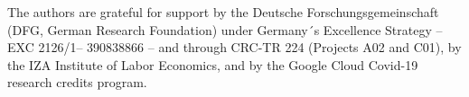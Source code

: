 The authors are grateful for support by the Deutsche Forschungsgemeinschaft (DFG, German
Research Foundation) under Germany´s Excellence Strategy – EXC 2126/1– 390838866 – and
through CRC-TR 224 (Projects A02 and C01), by the IZA Institute of Labor Economics, and
by the Google Cloud Covid-19 research credits program.

